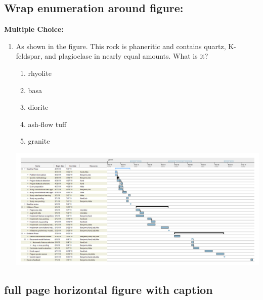 \subsection{Wrap enumeration around figure:}
  {\bfseries Multiple Choice: }%
  \begin{enumerate}
    \item As shown in the figure. This rock is phaneritic and contains quartz, K-feldspar, and plagioclase in nearly equal amounts. What is it?

    \begin{minipage}{.45\textwidth}
      \begin{enumerate}[label=(\Alph*), itemsep=0pt]%
        \item rhyolite
        \item basa
        \item diorite
        \item ash-flow tuff
        \item  granite
      \end{enumerate}
    \end{minipage}
    \begin{minipage}{.45\textwidth}
      \includegraphics[scale=0.1]{images/ganttV4horizontal.png}
    \end{minipage}
  \end{enumerate}



\subsection{full page horizontal figure with caption}


